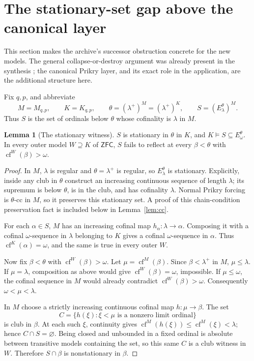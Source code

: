 \documentclass[11pt,letterpaper]{article}
\theoremstyle{definition}
\newtheorem{lemma}[definition]{Lemma}
\numberwithin{equation}{section}
\newcommand{\ZFC}{\mathsf{ZFC}}
\newcommand{\cf}{\operatorname{cf}}
\begin{document}
\section{The stationary-set gap above the canonical layer}\label{sec:stationary}

This section makes the archive's successor obstruction concrete for
the new models. The general collapse-or-destroy argument was already
present in the synthesis \cite[the successor-stationarity theorem]{synthesis};
the canonical Prikry layer, and its exact role in the application,
are the additional structure here.

Fix $q,p$, and abbreviate
\[
 M=M_{q,p},\qquad K=K_{q,p},\qquad
 \theta=(\lambda^+)^M=(\lambda^+)^K,
 \qquad S=(E_\lambda^\theta)^M.
\]
Thus $S$ is the set of ordinals below $\theta$ whose cofinality is
$\lambda$ in $M$.

\begin{lemma}[The stationary witness]\label{lem:stationary}
$S$ is stationary in $\theta$ in $K$, and
$K\models S\subseteq E_\omega^\theta$.
In every outer model $W\supseteq K$ of $\ZFC$, $S$ fails to reflect at
every $\beta<\theta$ with $\cf^W(\beta)>\omega$.
\end{lemma}

\begin{proof}
In $M$, $\lambda$ is regular and $\theta=\lambda^+$ is regular, so
$E_\lambda^\theta$ is stationary. Explicitly, inside any club in
$\theta$ construct an increasing continuous sequence of length
$\lambda$; its supremum is below $\theta$, is in the club, and has
cofinality $\lambda$. Normal Prikry forcing is $\theta$-cc in $M$,
so it preserves this stationary set. A proof of this chain-condition
preservation fact is included below in Lemma~\ref{lem:cc}.

For each $\alpha\in S$, $M$ has an increasing cofinal map
$h_\alpha:\lambda\to\alpha$. Composing it with a cofinal
$\omega$-sequence in $\lambda$ belonging to $K$ gives a cofinal
$\omega$-sequence in $\alpha$. Thus $\cf^K(\alpha)=\omega$,
and the same is true in every outer $W$.

Now fix $\beta<\theta$ with $\cf^W(\beta)>\omega$. Let
$\mu=\cf^M(\beta)$. Since $\beta<\lambda^+$ in $M$,
$\mu\le\lambda$. If $\mu=\lambda$, composition as above would give
$\cf^W(\beta)=\omega$, impossible. If $\mu\le\omega$, the cofinal
sequence in $M$ would already contradict $\cf^W(\beta)>\omega$.
Consequently $\omega<\mu<\lambda$.

In $M$ choose a strictly increasing continuous cofinal map
$h:\mu\to\beta$. The set
\[
 C=\{h(\xi):\xi<\mu\text{ is a nonzero limit ordinal}\}
\]
is club in $\beta$. At each such $\xi$, continuity gives
$\cf^M(h(\xi))\le\cf^M(\xi)<\lambda$; hence $C\cap S=\varnothing$.
Being closed and unbounded in a fixed ordinal is absolute between
transitive models containing the set, so this same $C$ is a club
witness in $W$. Therefore $S\cap\beta$ is nonstationary in $\beta$.
\end{proof}
\end{document}
